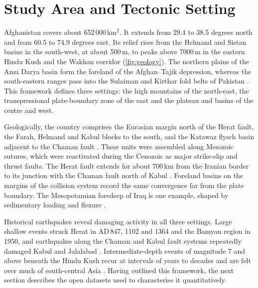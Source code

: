 \documentclass[11pt]{article}
\begin{document}
\section{Study Area and Tectonic Setting}\label{sec:studyarea}

Afghanistan covers about 652\,000\,km$^2$. It extends from 29.4 to 38.5 degrees
north and from 60.5 to 74.9 degrees east. Its relief rises from the Helmand and
Sistan basins in the south-west, at about 500\,m, to peaks above 7000\,m in the
eastern Hindu Kush and the Wakhan corridor (\cref{fig:geology}). The northern
plains of the Amu Darya basin form the foreland of the Afghan--Tajik depression,
whereas the south-eastern ranges pass into the Sulaiman and Kirthar fold belts of
Pakistan \cite{Tapponnier1981, Doebrich2006}. This framework defines
three settings: the high mountains of the north-east, the transpressional
plate-boundary zone of the east and the plateau and basins of the centre and west.

Geologically, the country comprises the Eurasian margin north of the Herat fault,
the Farah, Helmand and Kabul blocks to the south, and the Katawaz flysch basin
adjacent to the Chaman fault \cite{Tapponnier1981, Doebrich2006, Wheeler2005}. These
units were assembled along Mesozoic sutures, which were reactivated during the
Cenozoic as major strike-slip and thrust faults. The Herat fault extends for about
700\,km from the Iranian border to its junction with the Chaman fault north of
Kabul \cite{Zhao2025, Ruleman2007}. Foreland basins on the margins of the
collision system record the same convergence far from the plate boundary. The
Mesopotamian foredeep of Iraq is one example, shaped by sedimentary loading and
flexure \cite{Jackson1984, Talebian2004, Lemenkova202132, Vernant2004,
Walker2004}.

Historical earthquakes reveal damaging activity in all three settings. Large
shallow events struck Herat in AD\,847, 1102 and 1364 and the Bamyan region in
1950, and earthquakes along the Chaman and Kabul fault systems repeatedly damaged
Kabul and Jalalabad \cite{Ambraseys2003, Zhao2025}. Intermediate-depth events of
magnitude 7 and above beneath the Hindu Kush recur at intervals of years to decades
and are felt over much of south-central Asia \cite{Dewey2006, Pegler1998,
Zhan2016}. Having outlined this framework, the next section describes the open
datasets used to characterise it quantitatively.
\end{document}
